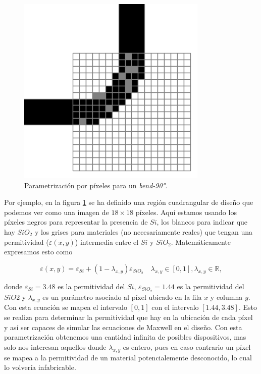 \begin{figure}[h]
  \centering
  \includegraphics[scale=0.7]{image/theory/parametrization-pixeles.png}
  \caption{Parametrización por píxeles para un \emph{bend-90°.}}
  \label{fig:pixeles}
\end{figure}

Por ejemplo, en la figura \ref{fig:pixeles} se ha definido una región cuadrangular de
diseño que podemos ver como una imagen de $18 \times 18$ píxeles.
Aquí estamos usando los píxeles negros para representar la presencia de $Si$,
los blancos para indicar que hay $SiO_2$ y los grises para materiales (no
necesariamente reales) que tengan una permitividad ($\varepsilon(x, y)$) intermedia entre el $Si$
y $SiO_2$. Matemáticamente expresamos esto como

\begin{equation}
  \varepsilon(x, y) = \varepsilon_{Si} + (1 - \lambda_{x,y})
  \varepsilon_{SiO_2} \quad \lambda_{x, y} \in [0, 1], \lambda_{x, y} \in
  \mathbb{R}, 
\label{eq:permitivity}
\end{equation}

donde $\varepsilon_{Si} = 3.48$ es la permitividad del $Si$,
$\varepsilon_{SiO_2} = 1.44$ es la permitividad del $SiO2$ y $\lambda_{x, y}$
es un parámetro asociado al píxel ubicado en la fila $x$ y columna $y$.
Con esta ecuación se mapea el intervalo $[0, 1]$ con el intervalo $[1.44, 3.48]$. 
Esto se realiza para determinar la permitividad que hay en la ubicación de cada
píxel y así ser capaces de simular las ecuaciones de Maxwell en el diseño.
Con esta parametrización obtenemos una cantidad infinita de posibles dispositivos, 
mas solo nos interesan aquellos donde $\lambda_{x,y}$ es entero, 
pues en caso contrario un píxel se mapea a la permitividad de un material
potencialemente desconocido, lo cual lo volvería infabricable.

